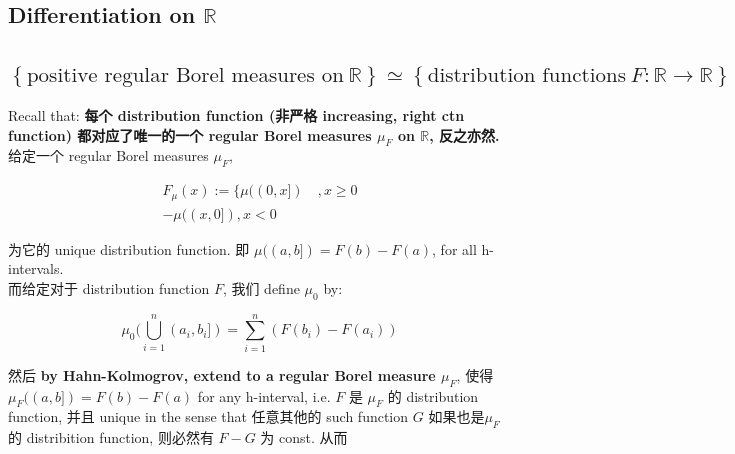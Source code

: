 \documentclass{qlnotes-export}
\begin{document}
\subsection{\texorpdfstring{Differentiation on \(\mathbb{R}\)}{Differentiation on \textbackslash mathbb\{R\}}}\label{differentiation-on-mathbbr}

\subsection{\texorpdfstring{\(\left\{ {\text{positive regular Borel measures on}\ {\mathbb{R}}} \right\} \simeq \left\{ {\text{distribution functions}\ F:{\mathbb{R}}\rightarrow{\mathbb{R}}} \right\}\)}{\textbackslash left\textbackslash\{ \{\textbackslash text\{positive regular Borel measures on\}\textbackslash{} \{\textbackslash mathbb\{R\}\}\} \textbackslash right\textbackslash\} \textbackslash simeq \textbackslash left\textbackslash\{ \{\textbackslash text\{distribution functions\}\textbackslash{} F:\{\textbackslash mathbb\{R\}\}\textbackslash rightarrow\{\textbackslash mathbb\{R\}\}\} \textbackslash right\textbackslash\}}}\label{left-textpositive-regular-borel-measures-on-mathbbr-right-simeq-left-textdistribution-functions-fmathbbrrightarrowmathbbr-right}

Recall that: \textbf{每个 distribution function (非严格 increasing, right ctn function) 都对应了唯一的一个 regular Borel measures \(\mu_{F}\) on \(\mathbb{R}\), 反之亦然.}\\
给定一个 regular Borel measures \(\mu_{F}\),

\[\begin{matrix}
{F_{\mu}(x) := \{\mu((0,x\rbrack)\quad,x \geq 0} \\
{- \mu((x,0\rbrack),x < 0}
\end{matrix}\]

为它的 unique distribution function. 即 \(\mu((a,b\rbrack) = F(b) - F(a)\), for all h-intervals.\\
而给定对于 distribution function \(F\), 我们 define \(\mu_{0}\) by:

\[\mu_{0}(\bigcup\limits_{i = 1}^{n}(a_{i},b_{i}\rbrack) = \sum\limits_{i = 1}^{n}(F(b_{i}) - F(a_{i}))\]

然后 \textbf{by Hahn-Kolmogrov, extend to a regular Borel measure \(\mu_{F}\)}, 使得 \(\mu_{F}((a,b\rbrack) = F(b) - F(a)\) for any h-interval, i.e. \(F\) 是 \(\mu_{F}\) 的 distribution function, 并且 unique in the sense that 任意其他的 such function \(G\) 如果也是\(\mu_{F}\) 的 distribition function, 则必然有 \(F - G\) 为 const. 从而
\end{document}
